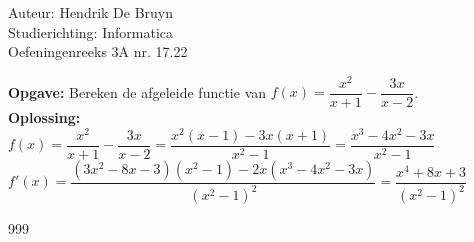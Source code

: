 \documentclass[a4paper]{article}
\begin{document}
  
\noindent \large Auteur: Hendrik De Bruyn \\
\noindent \large Studierichting: Informatica\\
\noindent \large Oefeningenreeks 3A nr. 17.22\\

\medskip

\normalsize

\textbf{Opgave:} Bereken de afgeleide functie van $f(x) = \dfrac{x^2}{x+1} - \dfrac{3x}{x-2}$. \\

\textbf{Oplossing:} \\

$f\left(x\right)
    = \dfrac{x^2}{x+1} - \dfrac{3x}{x-2}
    = \dfrac{x^2\left(x-1\right) - 3x\left(x+1\right)}{x^2 - 1}
    = \dfrac{x^3 -4x^2 -3x}{x^2 - 1}$ \\

$f'\left(x\right)
    = \dfrac{\left(3x^2 -8x -3\right)\left(x^2 -1\right) - 2x\left(x^3 -4x^2 -3x\right)}{\left(x^2 - 1\right)^2}
    = \dfrac{x^4 + 8x + 3}{\left(x^2 - 1\right)^2}$ \\

\begin{thebibliography}{999}
\end{thebibliography}
\end{document}
